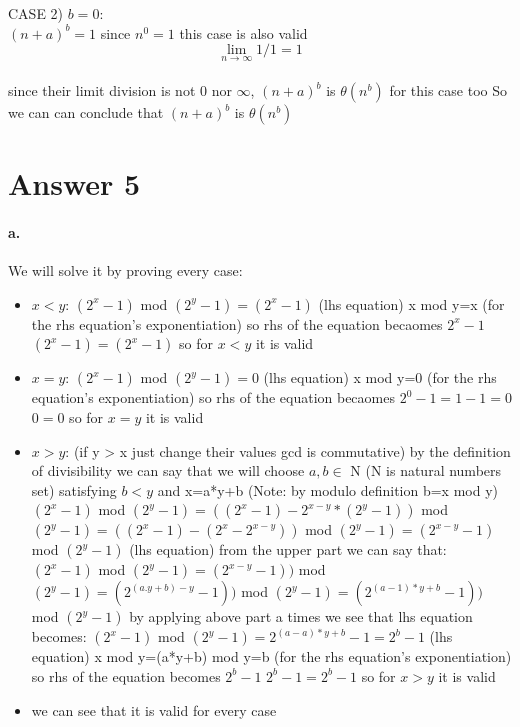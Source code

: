 \documentclass[11pt]{article}
\begin{document}
CASE 2) $b=0$:\\
$(n + a)^{b}=1$ since $n^{0}=1$ this case is also valid\\
\[ \lim_{n\to\infty} 1/1=1 \]	\\
since their limit division is not 0 nor $\infty$, $(n+a)^{b}$ is $\theta(n^{b})$ for this case too
So we can can conclude that $(n+a)^{b}$ is $\theta(n^{b})$\\



\section*{Answer 5}
\paragraph{a.}
We will solve it by proving every case:
\begin{itemize}
\item $x<y$:
\subitem $(2^{x}-1)$ mod $(2^{y}-1)=(2^{x}-1)$  (lhs equation)
\subitem x mod y=x (for the rhs equation's exponentiation)
\subitem so rhs of the equation becaomes $2^{x}-1$
\subitem $(2^{x}-1)=(2^{x}-1)$ so for $x<y$ it is valid

\item $x=y$:
\subitem $(2^{x}-1)$ mod $(2^{y}-1)=0$  (lhs equation)
\subitem x mod y=0 (for the rhs equation's exponentiation)
\subitem so rhs of the equation becaomes $2^{0}-1=1-1=0$
\subitem $0=0$ so for $x=y$ it is valid

\item $x>y$: (if y > x just change their values gcd is commutative)
\subitem by the definition of divisibility we can say that we will choose $a,b\in$ N (N is natural numbers set) satisfying $b<y$ and x=a*y+b
\subitem (Note: by modulo definition b=x mod y)
\subitem $(2^{x}-1)$ mod $(2^{y}-1)=((2^{x}-1)-2^{x-y}*(2^{y}-1)) $ mod $(2^{y}-1)=((2^{x}-1)-(2^{x}-2^{x-y}))$ mod $(2^{y}-1)=(2^{x-y}-1)$ mod $(2^{y}-1)$  (lhs equation)
\subitem from the upper part we can say that: $(2^{x}-1)$ mod $(2^{y}-1)=(2^{x-y}-1))$ mod $(2^{y}-1)=(2^{(a.y+b)-y}-1))$ mod $(2^{y}-1)=(2^{(a-1)*y+b}-1))$ mod $(2^{y}-1)$
\subitem by applying above part a times we see that lhs equation becomes: $(2^{x}-1)$ mod $(2^{y}-1)=2^{(a-a)*y+b}-1=2^{b}-1$ (lhs equation)
\subitem x mod y=(a*y+b) mod y=b (for the rhs equation's exponentiation)
\subitem so rhs of the equation becomes $2^{b}-1$
\subitem $2^{b}-1=2^{b}-1$ so for $x>y$ it is valid
\item we can see that it is valid for every case
\end{itemize}
\end{document}
